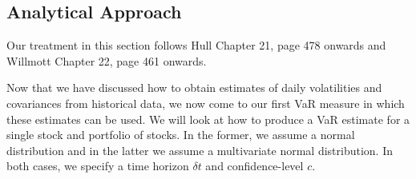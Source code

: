 \documentclass[../Dissertation.tex]{subfiles}
\begin{document}
\subsection{Analytical Approach}
\label{section:analytical}

Our treatment in this section follows Hull \cite{Hull:2012} Chapter 21, page 478 onwards and Willmott \cite{Wilmott:2007} Chapter 22, page 461 onwards.

Now that we have discussed how to obtain estimates of daily volatilities and covariances from historical data, we now come to our first VaR measure in which these estimates can be used.
We will look at how to produce a VaR estimate for a single stock and portfolio of stocks. 
In the former, we assume a normal distribution and in the latter we assume a multivariate normal distribution.
In both cases, we specify a time horizon $\delta{t}$ and confidence-level $c$.
\end{document}

